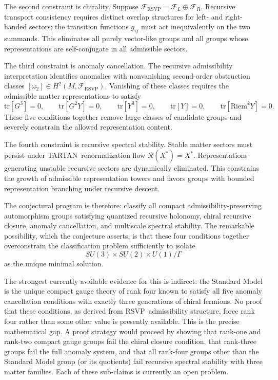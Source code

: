 \documentclass[12pt,a4paper]{article}
\newcommand{\RSVP}{\textrm{RSVP}}
\newcommand{\TARTAN}{\textrm{TARTAN}}
\newcommand{\Sheaf}{\mathcal{F}}
\begin{document}
The second constraint is chirality. Suppose $\Sheaf_\RSVP=\Sheaf_L\oplus\Sheaf_R$.
Recursive transport consistency requires distinct overlap structures for left-
and right-handed sectors: the transition functions $g_{ij}$ must act
inequivalently on the two summands. This eliminates all purely vector-like
groups and all groups whose representations are self-conjugate in all
admissible sectors.

The third constraint is anomaly cancellation. The recursive admissibility
interpretation identifies anomalies with nonvanishing second-order obstruction
classes $[\omega_2]\in H^2(M,\Sheaf_\RSVP)$. Vanishing of these classes
requires the admissible matter representations to satisfy
\[
\mathrm{tr}[G^3]=0,\qquad
\mathrm{tr}[G^2Y]=0,\qquad
\mathrm{tr}[Y^3]=0,\qquad
\mathrm{tr}[Y]=0,\qquad
\mathrm{tr}[\mathrm{Riem}^2 Y]=0.
\]
These five conditions together remove large classes of candidate groups and
severely constrain the allowed representation content.

The fourth constraint is recursive spectral stability. Stable matter sectors
must persist under \TARTAN\ renormalization flow $\mathcal{R}(X^\ast)=X^\ast$.
Representations generating unstable recursive sectors are dynamically
eliminated. This constrains the growth of admissible representation towers and
favors groups with bounded representation branching under recursive descent.

The conjectural program is therefore: classify all compact admissibility-pre\-serv\-ing automorphism groups satisfying quantized recursive holonomy, chiral recursive
closure, anomaly cancellation, and multiscale spectral stability. The remarkable
possibility, which the conjecture asserts, is that these four conditions
together overconstrain the classification problem sufficiently to isolate
\[
SU(3)\times SU(2)\times U(1)/\Gamma
\]
as the unique minimal solution.

The strongest currently available evidence for this is indirect: the Standard
Model is the unique compact gauge theory of rank four known to satisfy all five
anomaly cancellation conditions with exactly three generations of chiral
fermions. No proof that these conditions, as derived from \RSVP\ admissibility
structure, force rank four rather than some other value is presently available.
This is the precise mathematical gap. A proof strategy would proceed by showing
that rank-one and rank-two compact gauge groups fail the chiral closure
condition, that rank-three groups fail the full anomaly system, and that all
rank-four groups other than the Standard Model group (or its quotients) fail
recursive spectral stability with three matter families. Each of these sub-claims
is currently an open problem.
\end{document}
